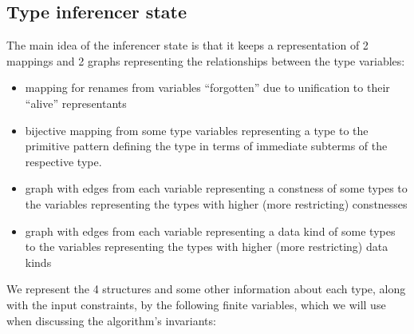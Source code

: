 \subsection{Type inferencer state}

The main idea of the inferencer state is that it keeps a representation of 2 mappings and 2 graphs representing the relationships between the type variables:

\begin{itemize}
    \item mapping for renames from variables ``forgotten'' due to unification to their ``alive'' representants
    \item bijective mapping from some type variables representing a type to the primitive pattern defining the type in terms of immediate subterms of the respective type.
    \item graph with edges from each variable representing a constness of some types to the variables representing the types with higher (more restricting) constnesses
    \item graph with edges from each variable representing a data kind of some types to the variables representing the types with higher (more restricting) data kinds
\end{itemize}

We represent the 4 structures and some other information about each type, along with the input constraints, by the following finite variables, which we will use when discussing the algorithm's invariants:

